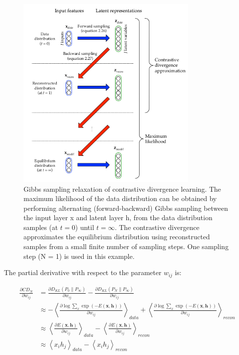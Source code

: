 \documentclass[a4paper,11pt]{report}
\begin{document}
		\begin{figure}[H]
			\begin{center}
				\includegraphics[width=3.5in]{Images/RBM_DNN/gibbs_sampling.png}
				\caption[The Gibbs sampling procedure]{Gibbs sampling relaxation of contrastive divergence learning. The maximum likelihood of the data distribution can be obtained by performing alternating (forward-backward) Gibbs sampling between the input layer x and latent layer h, from the data distribution samples (at $t=0$) until $t=\infty$. The contrastive divergence approximates the equilibrium distribution using reconstructed samples from a small finite number of sampling steps. One sampling step (N = 1) is used in this example.}
				\label{fig:Gibbs sampling}
			\end{center}
		\end{figure}
		
		The partial derivative with respect to the parameter $w_{ij}$ is:
		
		\begin{equation}
			\begin{split}
				\frac{\partial CD_{N}}{ \partial w_{ij}} 
									&= \frac{\partial D_{KL}(P_{0}\|P_{\infty})} {\partial w_{ij}} - \frac{\partial D_{KL}(P_{N}\|P_{\infty})} {\partial w_{ij}}  \\
									&\approx - \left\langle \frac{\partial \log \sum_{x}{\exp{(-E(\mathbf{x,h}))}}}{\partial w_{ij}} \right\rangle_{data} +
													\left\langle \frac{\partial \log \sum_{x}{\exp{(-E(\mathbf{x,h}))}}}{\partial w_{ij}} \right\rangle_{recon} \\
									&\approx \left\langle \frac{\partial E(\mathbf{x,h})}{\partial w_{ij}} \right\rangle_{data} - \left\langle \frac{\partial E(\mathbf{x,h})}{\partial w_{ij}} \right\rangle_{recon} \\
									&\approx \left\langle x_{i}h_{j} \right\rangle_{data} - \left\langle x_{i}h_{j} \right\rangle_{recon}
			\end{split}
		\end{equation}\\
		
\end{document}
